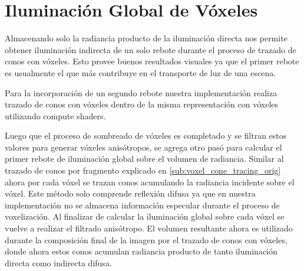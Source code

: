 \section{Iluminación Global de Vóxeles} %
\label{sec:iluminacion_global_de_voxeles}
Almacenando solo la radiancia producto de la iluminación directa nos permite obtener iluminación indirecta de un solo rebote durante el proceso de trazado de conos con vóxeles. Esto provee buenos resultados visuales ya que el primer rebote es usualmente el que más contribuye en el transporte de luz de una escena.

Para la incorporación de un segundo rebote nuestra implementación realiza trazado de conos con vóxeles dentro de la misma representación con vóxeles utilizando compute shaders. 

Luego que el proceso de sombreado de vóxeles es completado y se filtran estos valores para generar vóxeles anisótropos, se agrega otro pasó para calcular el primer rebote de iluminación global sobre el volumen de radiancia. Similar al trazado de conos por fragmento explicado en \ref{sub:voxel_cone_tracing_orig} ahora por cada vóxel se trazan conos acumulando la radiancia incidente sobre el vóxel. Este método solo comprende reflexión difusa ya que en nuestra implementación no se almacena información especular durante el proceso de voxelización. Al finalizar de calcular la iluminación global sobre cada vóxel se vuelve a realizar el filtrado anisótropo. El volumen resultante ahora es utilizado durante la composición final de la imagen por el trazado de conos con vóxeles, donde ahora estos conos acumulan radiancia producto de tanto iluminación directa como indirecta difusa.
